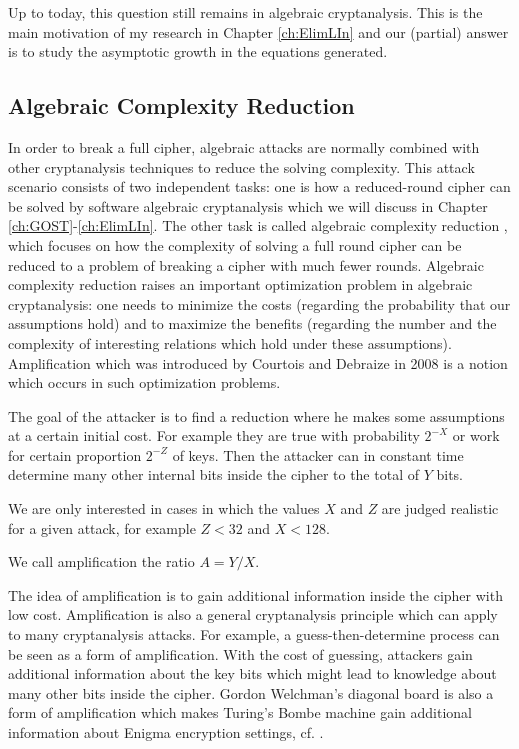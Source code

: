 Up to today, this question still remains in algebraic cryptanalysis. This is the main motivation of my research in Chapter \ref{ch:ElimLIn} and our (partial)  answer is to study the asymptotic growth in the equations generated. 

\subsection{Algebraic Complexity Reduction} \label{sec:ACReduction}

In order to break a full cipher, algebraic attacks are normally combined with other cryptanalysis techniques to reduce the solving complexity. This attack scenario consists of two independent tasks: one is how a reduced-round cipher can be solved by software algebraic cryptanalysis which we will discuss in Chapter \ref{ch:GOST}-\ref{ch:ElimLIn}. The other task is called algebraic complexity reduction \cite{gostreport,gostac}, which focuses on how the complexity of solving a full round cipher can be reduced to a problem of breaking a cipher with much fewer rounds. Algebraic complexity reduction raises an important optimization problem in algebraic cryptanalysis: one needs to minimize the costs (regarding the probability that our assumptions hold) and to maximize the benefits (regarding the number and the complexity of interesting relations
which hold under these assumptions).  Amplification which was introduced by Courtois and Debraize in 2008 \cite{AlgSnowCourtoisDebraize} is a notion which occurs in such optimization problems.

\begin{mydef}
	The goal of the attacker
	is to find a reduction where he makes some assumptions
	at a certain initial cost.
	For example they are true with probability $2^{-X}$
	or work for certain proportion $2^{-Z}$ of keys.
	Then the attacker can in constant time determine
	many other internal bits inside the cipher to the total of $Y$ bits.
	
	We are only interested in cases in which the values
	$X$ and $Z$ are judged realistic for a given attack,
	for example $Z<32$ and $X<128$.
	
	We call amplification the ratio $A=Y/X$.
\end{mydef}

The idea of amplification is to gain additional information inside the cipher with low cost. Amplification is also a general cryptanalysis principle which can apply to many cryptanalysis attacks. For example, a guess-then-determine process can be seen as a form of amplification. With the cost of guessing, attackers gain additional information about the key bits which might lead to knowledge about many other bits inside the cipher. 
Gordon Welchman's diagonal board is also a form of amplification which makes Turing's Bombe machine gain additional information about Enigma encryption settings, cf. \cite{CourtoisBlockEnigmaSlides}. 


